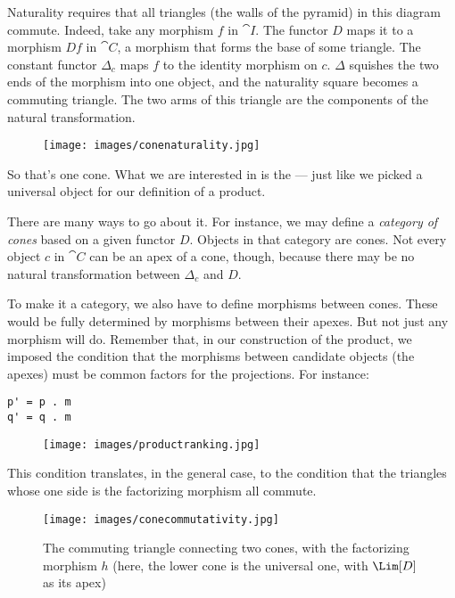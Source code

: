 \noindent
Naturality requires that all triangles (the walls of the pyramid) in
this diagram commute. Indeed, take any morphism $f$ in $\cat{I}$.
The functor $D$ maps it to a morphism $D f$ in $\cat{C}$, a
morphism that forms the base of some triangle. The constant functor
$\Delta_c$ maps $f$ to the identity morphism on
$c$. $\Delta$ squishes the two ends of the morphism into one object, and
the naturality square becomes a commuting triangle. The two arms of this
triangle are the components of the natural transformation.

\begin{figure}[H]
\centering
\texttt{[image: images/conenaturality.jpg]}
\end{figure}

\noindent
So that's one cone. What we are interested in is the  --- just like we picked a universal object for our definition of a
product.

There are many ways to go about it. For instance, we may define a
\emph{category of cones} based on a given functor $D$. Objects in that
category are cones. Not every object $c$ in $\cat{C}$ can be an
apex of a cone, though, because there may be no natural transformation
between $\Delta_c$ and $D$.

To make it a category, we also have to define morphisms between cones.
These would be fully determined by morphisms between their apexes. But
not just any morphism will do. Remember that, in our construction of the
product, we imposed the condition that the morphisms between candidate
objects (the apexes) must be common factors for the projections. For
instance:

\begin{Verbatim}
p' = p . m
q' = q . m
\end{Verbatim}

\begin{figure}[H]
\centering
\texttt{[image: images/productranking.jpg]}
\end{figure}

This condition translates, in the general case, to the condition that
the triangles whose one side is the factorizing morphism all commute.

\begin{figure}[H]
\centering
\texttt{[image: images/conecommutativity.jpg]}
\caption{The commuting triangle connecting two cones, with the factorizing
morphism $h$ (here, the lower cone is the universal one, with
$\Lim[D]$ as its apex)}
\end{figure}

